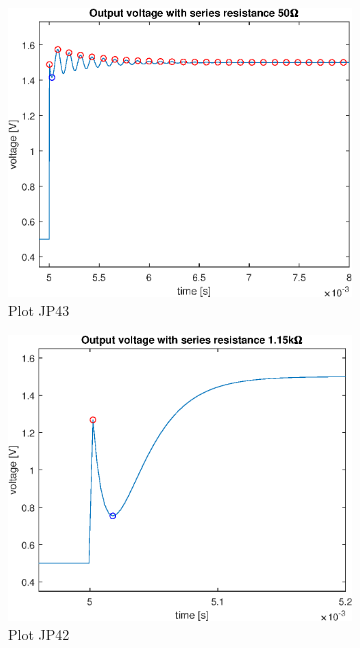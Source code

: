 \documentclass[notitlepage, a4paper, 11pt]{article}
\begin{document}
		\begin{figure}[H]
		\centering
		\begin{subfigure}{0.3 \textwidth}
			\includegraphics[width=\textwidth]{../Matlab/img/CircuitC3out}
			\caption{Plot JP43}
		\end{subfigure}
		\hfill
		\begin{subfigure}{0.3 \textwidth}
			\includegraphics[width=\textwidth]{../Matlab/img/CircuitC2out}
			\caption{Plot JP42}
		\end{subfigure}
		\hfill
		\begin{subfigure}{0.3 \textwidth}

\end{subfigure}
\end{figure}
\end{document}
